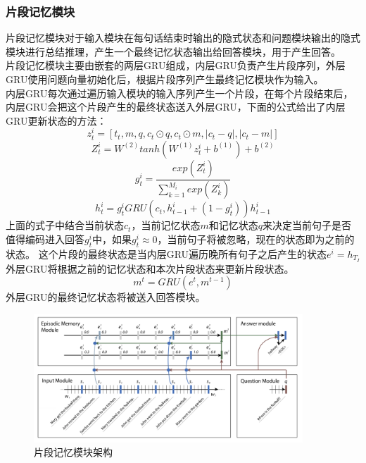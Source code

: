 \subsubsection{片段记忆模块}
片段记忆模块对于输入模块在每句话结束时输出的隐式状态和问题模块输出的隐式模块进行总结推理，产生一个最终记忆状态输出给回答模块，用于产生回答。\\
片段记忆模块主要由嵌套的两层GRU组成，内层GRU负责产生片段序列，外层GRU使用问题向量初始化后，根据片段序列产生最终记忆模块作为输入。\\
内层GRU每次通过遍历输入模块的输入序列产生一个片段，在每个片段结束后，内层GRU会把这个片段产生的最终状态送入外层GRU，下面的公式给出了内层GRU更新状态的方法：\cite{xiong2016dynamic}\\
\begin{equation}
z^i_t = [t_t,m,q,c_t \odot q, c_t \odot m,| c_t - q |,|c_t - m|]
\end{equation}
\begin{equation}
Z^i_t = W^{(2)}tanh(W^{(1)}z^i_t+b^{(1)})+b^{(2)}
\end{equation}
\begin{equation}
g^i_t = \frac{exp(Z^i_t)}{\sum_{k=1}^{M_i}exp(Z^i_k)}
\end{equation}
\begin{equation}
h^i_t = g^i_tGRU(c_t,h^i_{t-1} + (1 - g^i_t))h^i_{t-1}
\end{equation}
上面的式子中结合当前状态$c_t$，当前记忆状态$m$和记忆状态$q$来决定当前句子是否值得编码进入回答$g^i_t$中，如果$g^i_t \approx 0$，当前句子将被忽略，现在的状态即为之前的状态。
这个片段的最终状态是当内层GRU遍历晚所有句子之后产生的状态$e^i = h_{T_I}$\\
外层GRU将根据之前的记忆状态和本次片段状态来更新片段状态。\\
\begin{equation}
m^t = GRU(e^t,m^{t-1})
\end{equation}
外层GRU的最终记忆状态将被送入回答模块。
\begin{figure}[h]
      \centering
        \includegraphics[width=0.9\textwidth]{./images/episodic-memory-structure}
          \caption{片段记忆模块架构}
      \end{figure}
